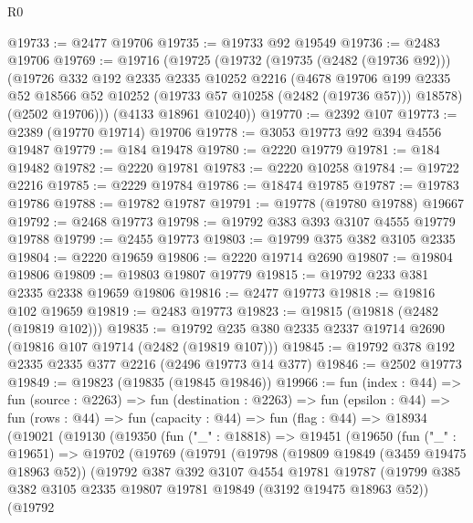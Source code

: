 \begin{lexlean}{R0}
\begin{coremodule}
@19733 := @2477 @19706
@19735 := @19733 @92 @19549
@19736 := @2483 @19706
@19769 := @19716
    (@19725
      (@19732
        (@19735 (@2482 (@19736 @92)))
        (@19726
          @332
          @192
          @2335
          @2335
          @10252
          @2216
          (@4678
            @19706
            @199
            @2335
            @52
            @18566
            @52
            @10252
            (@19733 @57 @10258 (@2482 (@19736 @57)))
            @18578)
          (@2502 @19706)))
      (@4133 @18961 @10240))
@19770 := @2392 @107
@19773 := @2389 (@19770 @19714) @19706
@19778 := @3053 @19773 @92 @394 @4556 @19487
@19779 := @184 @19478
@19780 := @2220 @19779
@19781 := @184 @19482
@19782 := @2220 @19781
@19783 := @2220 @10258
@19784 := @19722 @2216
@19785 := @2229 @19784
@19786 := @18474 @19785
@19787 := @19783 @19786
@19788 := @19782 @19787
@19791 := @19778 (@19780 @19788) @19667
@19792 := @2468 @19773
@19798 := @19792 @383 @393 @3107 @4555 @19779 @19788
@19799 := @2455 @19773
@19803 := @19799 @375 @382 @3105 @2335
@19804 := @2220 @19659
@19806 := @2220 @19714 @2690
@19807 := @19804 @19806
@19809 := @19803 @19807 @19779
@19815 := @19792 @233 @381 @2335 @2338 @19659 @19806
@19816 := @2477 @19773
@19818 := @19816 @102 @19659
@19819 := @2483 @19773
@19823 := @19815 (@19818 (@2482 (@19819 @102)))
@19835 := @19792 @235 @380 @2335 @2337 @19714 @2690 (@19816 @107 @19714 (@2482 (@19819 @107)))
@19845 := @19792 @378 @192 @2335 @2335 @377 @2216 (@2496 @19773 @14 @377)
@19846 := @2502 @19773
@19849 := @19823 (@19835 (@19845 @19846))
@19966 := fun (index : @44) =>
  fun (source : @2263) =>
  fun (destination : @2263) =>
  fun (epsilon : @44) =>
  fun (rows : @44) =>
  fun (capacity : @44) =>
  fun (flag : @44) =>
  @18934
    (@19021
      (@19130
        (@19350
          (fun ("_" : @18818) =>
          @19451
            (@19650
              (fun ("_" : @19651) =>
              @19702
                (@19769
                  (@19791
                    (@19798
                      (@19809 @19849 (@3459 @19475 @18963 @52))
                      (@19792
                        @387
                        @392
                        @3107
                        @4554
                        @19781
                        @19787
                        (@19799
                          @385
                          @382
                          @3105
                          @2335
                          @19807
                          @19781
                          @19849
                          (@3192 @19475 @18963 @52))
                        (@19792

\end{coremodule}
\end{lexlean}
